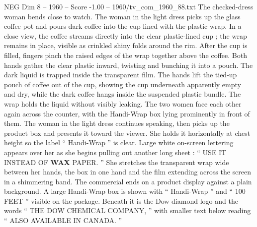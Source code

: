\begin{textsample}{NEG Dim 8 – 1960 – Score -1.00 – 1960/tv\_com\_1960\_88.txt}
The checked-dress woman bends close to watch.
The woman in the light dress picks up the glass coffee pot and pours dark coffee into the cup lined with the plastic wrap.
In a close view, the coffee streams directly into the clear plastic-lined cup ; the wrap remains in place, visible as crinkled shiny folds around the rim.
After the cup is filled, fingers pinch the raised edges of the wrap together above the coffee.
Both hands gather the clear plastic inward, twisting and bunching it into a pouch.
The dark liquid is trapped inside the transparent film.
The hands lift the tied-up pouch of coffee out of the cup, showing the cup underneath apparently empty and dry, while the dark coffee hangs inside the suspended plastic bundle.
The wrap holds the liquid without visibly leaking.
The two women face each other again across the counter, with the Handi-Wrap box lying prominently in front of them.
The woman in the light dress continues speaking, then picks up the product box and presents it toward the viewer.
She holds it horizontally at chest height so the label “ Handi-Wrap ” is clear.
Large white on-screen lettering appears over her as she begins pulling out another long sheet : “ USE IT INSTEAD OF \textbf{WAX} PAPER. ” She stretches the transparent wrap wide between her hands, the box in one hand and the film extending across the screen in a shimmering band.
The commercial ends on a product display against a plain background.
A large Handi-Wrap box is shown with “ Handi-Wrap ” and “ 100 FEET ” visible on the package.
Beneath it is the Dow diamond logo and the words “ THE DOW CHEMICAL COMPANY, ” with smaller text below reading “ ALSO AVAILABLE IN CANADA. ”

\end{textsample}
